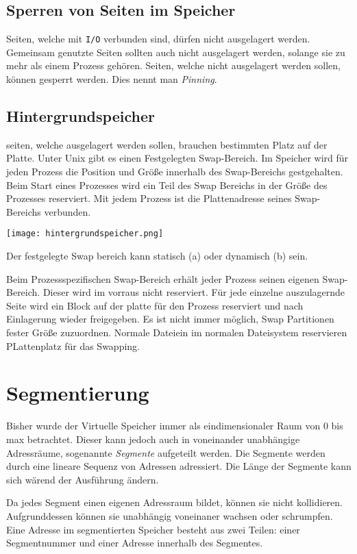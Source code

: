 \subsection{Sperren von Seiten im Speicher}

Seiten, welche mit \texttt{I/O} verbunden sind, dürfen nicht ausgelagert werden. Gemeinsam genutzte Seiten sollten auch nicht ausgelagert werden, solange sie zu mehr als einem Prozess gehören. Seiten, welche nicht ausgelagert werden sollen, können gesperrt werden. Dies nennt man \textit{Pinning}.

\subsection{Hintergrundspeicher}

seiten, welche ausgelagert werden sollen, brauchen bestimmten Platz auf der Platte. Unter Unix gibt es einen Festgelegten Swap-Bereich. Im Speicher wird für jeden Prozess die Position und Größe innerhalb des Swap-Bereichs gestgehalten. Beim Start eines Prozesses wird ein Teil des Swap Bereichs in der Größe des Prozesses reserviert. Mit jedem Prozess ist die Plattenadresse seines Swap-Bereichs verbunden. 

\texttt{[image: hintergrundspeicher.png]}

Der festgelegte Swap bereich kann statisch (a) oder dynamisch (b) sein. 

Beim Prozessspezifischen Swap-Bereich erhält jeder Prozess seinen eigenen Swap-Bereich. Dieser wird im vorraus nicht reserviert. Für jede einzelne auszulagernde Seite wird ein Block auf der platte für den Prozess reserviert und nach Einlagerung wieder freigegeben. Es ist nicht immer möglich, Swap Partitionen fester Größe zuzuordnen. Normale Dateiein im normalen Dateisystem reservieren PLattenplatz für das Swapping. 

\section{Segmentierung}

Bisher wurde der Virtuelle Speicher immer als eindimensionaler Raum von 0 bis max betrachtet. Dieser kann jedoch auch in voneinander unabhängige Adressräume, sogenannte \textit{Segmente} aufgeteilt werden. Die Segmente werden durch eine lineare Sequenz von Adressen adressiert. Die Länge der Segmente kann sich wärend der Ausführung ändern. 

Da jedes Segment einen eigenen Adressraum bildet, können sie nicht kollidieren. Aufgrunddessen können sie unabhängig voneinaner wachsen oder schrumpfen. Eine Adresse im segmentierten Speicher besteht aus zwei Teilen: einer Segmentnummer und einer Adresse innerhalb des Segmentes.

